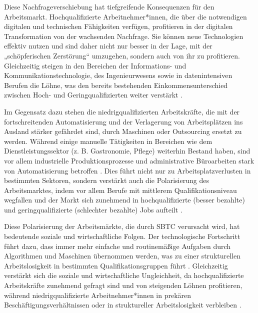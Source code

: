 Diese Nachfrageverschiebung hat tiefgreifende Konsequenzen für den Arbeitsmarkt. 
Hochqualifizierte Arbeitnehmer*innen, die über die notwendigen digitalen und technischen 
Fähigkeiten verfügen, profitieren in der digitalen Transformation von der wachsenden 
Nachfrage. Sie können neue Technologien effektiv nutzen und sind daher nicht nur besser in 
der Lage, mit der „schöpferischen Zerstörung“ \parencite[S. 81]{schumpeter1976capitalism} 
umzugehen, sondern auch von ihr zu profitieren. Gleichzeitig steigen in den Bereichen der 
Informations- und Kommunikationstechnologie, des Ingenieurwesens sowie in datenintensiven 
Berufen die Löhne, was den bereits bestehenden Einkommensunterschied zwischen Hoch- und 
Geringqualifizierten weiter verstärkt \parencite[S. 2511]{goos2014explaining}.

Im Gegensatz dazu stehen die niedrigqualifizierten Arbeitskräfte, die mit der fortschreitenden 
Automatisierung und der Verlagerung von Arbeitsplätzen ins Ausland stärker gefährdet sind, 
durch Maschinen oder Outsourcing ersetzt zu werden. Während einige manuelle Tätigkeiten in 
Bereichen wie dem Dienstleistungssektor (z. B. Gastronomie, Pflege) weiterhin Bestand haben, 
sind vor allem industrielle Produktionsprozesse und administrative Büroarbeiten stark von 
Automatisierung betroffen \parencite[S. 260]{frey2013thefuture}. Dies führt nicht nur zu 
Arbeitsplatzverlusten in bestimmten Sektoren, sondern verstärkt auch die Polarisierung des 
Arbeitsmarktes, indem vor allem Berufe mit mittlerem Qualifikationsniveau wegfallen und der 
Markt sich zunehmend in hochqualifizierte (besser bezahlte) und geringqualifizierte 
(schlechter bezahlte) Jobs aufteilt \parencite[S. 1283]{autor2003theskill}.

Diese Polarisierung der Arbeitsmärkte, die durch \ac{SBTC} verursacht wird, hat bedeutende soziale 
und wirtschaftliche Folgen. Der technologische Fortschritt führt dazu, dass immer mehr 
einfache und routinemäßige Aufgaben durch Algorithmen und Maschinen übernommen werden, was zu 
einer strukturellen Arbeitslosigkeit in bestimmten Qualifikationsgruppen führt 
\parencite[S. 2512]{goos2014explaining}. Gleichzeitig verstärkt sich die soziale und 
wirtschaftliche Ungleichheit, da hochqualifizierte Arbeitskräfte zunehmend gefragt sind und 
von steigenden Löhnen profitieren, während niedrigqualifizierte Arbeitnehmer*innen in 
prekären Beschäftigungsverhältnissen oder in struktureller Arbeitslosigkeit verbleiben 
\parencite[S. 12]{arntz2016therisk}.


